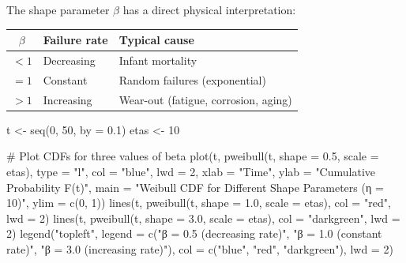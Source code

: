 \documentclass[
  letterpaper,
  DIV=11,
  numbers=noendperiod]{scrreprt}
\newenvironment{Shaded}{\begin{snugshade}}{\end{snugshade}}
\newcommand{\AttributeTok}[1]{\textcolor[rgb]{0.40,0.45,0.13}{#1}}
\newcommand{\CommentTok}[1]{\textcolor[rgb]{0.37,0.37,0.37}{#1}}
\newcommand{\DecValTok}[1]{\textcolor[rgb]{0.68,0.00,0.00}{#1}}
\newcommand{\FloatTok}[1]{\textcolor[rgb]{0.68,0.00,0.00}{#1}}
\newcommand{\FunctionTok}[1]{\textcolor[rgb]{0.28,0.35,0.67}{#1}}
\newcommand{\NormalTok}[1]{\textcolor[rgb]{0.00,0.23,0.31}{#1}}
\newcommand{\OtherTok}[1]{\textcolor[rgb]{0.00,0.23,0.31}{#1}}
\newcommand{\StringTok}[1]{\textcolor[rgb]{0.13,0.47,0.30}{#1}}
\newcounter{none} %
\begin{document}
The shape parameter \(\beta\) has a direct physical interpretation:

{\def\LTcaptype{none} %
\begin{longtable}[]{@{}cll@{}}
\toprule\noalign{}
\(\beta\) & Failure rate & Typical cause \\
\midrule\noalign{}
\endhead
\bottomrule\noalign{}
\endlastfoot
\(< 1\) & Decreasing & Infant mortality \\
\(= 1\) & Constant & Random failures (exponential) \\
\(> 1\) & Increasing & Wear-out (fatigue, corrosion, aging) \\
\end{longtable}
}

\begin{Shaded}
\begin{Highlighting}[]
\NormalTok{t    }\OtherTok{\textless{}{-}} \FunctionTok{seq}\NormalTok{(}\DecValTok{0}\NormalTok{, }\DecValTok{50}\NormalTok{, }\AttributeTok{by =} \FloatTok{0.1}\NormalTok{)}
\NormalTok{etas }\OtherTok{\textless{}{-}} \DecValTok{10}

\CommentTok{\# Plot CDFs for three values of beta}
\FunctionTok{plot}\NormalTok{(t, }\FunctionTok{pweibull}\NormalTok{(t, }\AttributeTok{shape =} \FloatTok{0.5}\NormalTok{, }\AttributeTok{scale =}\NormalTok{ etas), }\AttributeTok{type =} \StringTok{"l"}\NormalTok{, }\AttributeTok{col =} \StringTok{"blue"}\NormalTok{,  }\AttributeTok{lwd =} \DecValTok{2}\NormalTok{,}
     \AttributeTok{xlab =} \StringTok{"Time"}\NormalTok{, }\AttributeTok{ylab =} \StringTok{"Cumulative Probability F(t)"}\NormalTok{,}
     \AttributeTok{main =} \StringTok{"Weibull CDF for Different Shape Parameters (η = 10)"}\NormalTok{,}
     \AttributeTok{ylim =} \FunctionTok{c}\NormalTok{(}\DecValTok{0}\NormalTok{, }\DecValTok{1}\NormalTok{))}
\FunctionTok{lines}\NormalTok{(t, }\FunctionTok{pweibull}\NormalTok{(t, }\AttributeTok{shape =} \FloatTok{1.0}\NormalTok{, }\AttributeTok{scale =}\NormalTok{ etas), }\AttributeTok{col =} \StringTok{"red"}\NormalTok{,       }\AttributeTok{lwd =} \DecValTok{2}\NormalTok{)}
\FunctionTok{lines}\NormalTok{(t, }\FunctionTok{pweibull}\NormalTok{(t, }\AttributeTok{shape =} \FloatTok{3.0}\NormalTok{, }\AttributeTok{scale =}\NormalTok{ etas), }\AttributeTok{col =} \StringTok{"darkgreen"}\NormalTok{, }\AttributeTok{lwd =} \DecValTok{2}\NormalTok{)}
\FunctionTok{legend}\NormalTok{(}\StringTok{"topleft"}\NormalTok{,}
       \AttributeTok{legend =} \FunctionTok{c}\NormalTok{(}\StringTok{"β = 0.5 (decreasing rate)"}\NormalTok{, }\StringTok{"β = 1.0 (constant rate)"}\NormalTok{,}
                  \StringTok{"β = 3.0 (increasing rate)"}\NormalTok{),}
       \AttributeTok{col =} \FunctionTok{c}\NormalTok{(}\StringTok{"blue"}\NormalTok{, }\StringTok{"red"}\NormalTok{, }\StringTok{"darkgreen"}\NormalTok{), }\AttributeTok{lwd =} \DecValTok{2}\NormalTok{)}
\end{Highlighting}
\end{Shaded}
\end{document}
